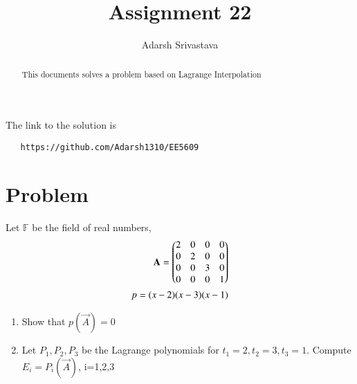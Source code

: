 \documentclass[journal,12pt,twocolumn]{IEEEtran}
\begin{document}
       \def\rightbox#1{\makebox[0in][r]{#1}}
       \def\centbox#1{\makebox[0in]{#1}}
       \def\topbox#1{\raisebox{-\baselineskip}[0in][0in]{#1}}
       \def\midbox#1{\raisebox{-0.5\baselineskip}[0in][0in]{#1}}
  \vspace{3cm}
  \title{Assignment 22}
  \author{Adarsh Srivastava}
  \maketitle
  \newpage
  \bigskip
  \renewcommand{\thetable}{\theenumi}
  The link to the solution is
  \begin{lstlisting}
   https://github.com/Adarsh1310/EE5609
  \end{lstlisting}
  \begin{abstract}
  This documents solves a problem based on Lagrange Interpolation
  \end{abstract}
\section{\textbf{Problem}}
Let $\mathbb{F}$ be the field of real numbers,
\begin{align*}
\mathbf{A}=\begin{pmatrix}2&0&0&0\\0&2&0&0\\0&0&3&0\\0&0&0&1\end{pmatrix}\\
p=(x-2)(x-3)(x-1)
\end{align*}
\begin{enumerate}
\item{Show that $p(\vec{A})=0$}
\item{Let $P_1,P_2,P_3$ be the Lagrange polynomials for $t_1=2, t_2=3,t_3=1$. Compute $E_i=P_i(\vec{A})$, i=1,2,3}
\end{enumerate}
\end{document}
